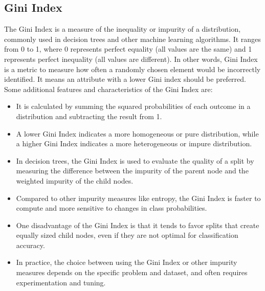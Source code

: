         \subsection{Gini Index}
        The Gini Index is a measure of the inequality or impurity of a distribution, commonly used in decision trees and other machine learning algorithms. It ranges from 0 to 1, where 0 represents perfect equality (all values are the same) and 1 represents perfect inequality (all values are different).
        In other words, Gini Index is a metric to measure how often a randomly chosen element would be incorrectly identified.
        It means an attribute with a lower Gini index should be preferred.
        Some additional features and characteristics of the Gini Index are:
        \begin{itemize}
            \item It is calculated by summing the squared probabilities of each outcome in a distribution and subtracting the result from 1.
            \item A lower Gini Index indicates a more homogeneous or pure distribution, while a higher Gini Index indicates a more heterogeneous or impure distribution.
            \item In decision trees, the Gini Index is used to evaluate the quality of a split by measuring the difference between the impurity of the parent node and the weighted impurity of the child nodes.
            \item Compared to other impurity measures like entropy, the Gini Index is faster to compute and more sensitive to changes in class probabilities.
            \item One disadvantage of the Gini Index is that it tends to favor splits that create equally sized child nodes, even if they are not optimal for classification accuracy.
            \item In practice, the choice between using the Gini Index or other impurity measures depends on the specific problem and dataset, and often requires experimentation and tuning.
        \end{itemize}

